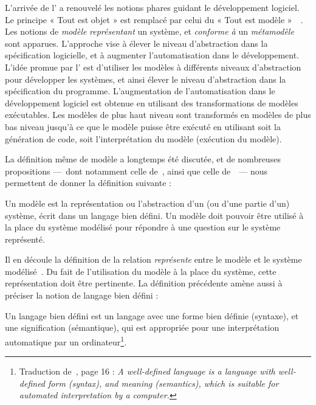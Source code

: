 L'arrivée de l'{\idm} a renouvelé les notions phares guidant le développement
logiciel. Le principe « Tout est objet » est remplacé par celui du «
Tout est modèle »~\cite{bezivin2004}~\cite{Bezivin2005a}. Les notions de
\emph{modèle} \emph{représentant} un système, et \emph{conforme à} un
\emph{métamodèle} sont apparues. L'approche {\idm} vise à élever le niveau
d'abstraction dans la spécification logicielle, et à augmenter l'automatisation
dans le développement. L'idée promue par l'{\idm} est d'utiliser les
modèles à différents niveaux d'abstraction pour développer les systèmes, et
ainsi élever le niveau d'abstraction dans la spécification du programme.
L'augmentation de l'automatisation dans le développement logiciel est obtenue
en utilisant des transformations de modèles exécutables. Les modèles de plus
haut niveau sont transformés en modèles de plus bas niveau jusqu'à ce que le
modèle puisse être exécuté en utilisant soit la génération de code, soit
l'interprétation du modèle (exécution du modèle).

La définition même de modèle a longtemps été discutée, et de nombreuses
propositions ---~dont notamment celle de~\cite{Bezivin2001a}, ainsi que celle
de~\cite{Kleppe2003}~--- nous permettent de donner la définition suivante :
\begin{definition}[Modèle] 
Un modèle est la représentation ou l'abstraction d'un (ou d'une partie d'un)
système, écrit dans un langage bien défini.  Un modèle doit pouvoir être
utilisé à la place du système modélisé pour répondre à une question sur le
système représenté.
\end{definition}

Il en découle la définition de la relation \emph{représente} entre le modèle et
le système modélisé~\cite{Atkinson2003,Seidewitz2003,Bezivin2005a}. Du fait de
l'utilisation du modèle à la place du système, cette représentation doit être
pertinente. La définition précédente amène aussi à préciser la notion de langage
bien défini :%
\begin{definition}
Un langage bien défini est un langage avec une forme bien définie (syntaxe), et
une signification (sémantique), qui est appropriée pour une interprétation
automatique par un ordinateur\footnote{Traduction de~\cite{Kleppe2003}, page 16
: \emph{A well-defined language is a language with well-defined form (syntax),
and meaning (semantics), which is suitable for automated interpretation by a
computer.}}.
\end{definition}

